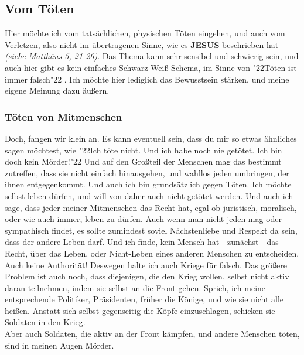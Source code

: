 \documentclass[10pt,a5paper]{article}
\newcommand{\Jesus}[0]{\textbf{JESUS}}
\newcommand{\q}[1]{\char"22{#1}\char"22 }
\begin{document}
	\subsection{Vom T\"oten}
		Hier m\"ochte ich vom tats\"achlichen,
		physischen T\"oten eingehen,
		und auch vom Verletzen,
		also nicht im \"ubertragenen Sinne,
		wie es {\Jesus} beschrieben hat
		\textit{(siehe \href{https://www.die-bibel.de/bibeln/online-bibeln/lesen/LU17/MAT.5/Matthäus-5}{Matth\"aus 5, 21-26})}.
		Das Thema kann sehr sensibel und schwierig sein,
		und auch hier gibt es kein einfaches Schwarz-Wei{\ss}-Schema,
		im Sinne von \q{T\"oten ist immer falsch}.
		Ich m\"ochte hier lediglich das Bewusstsein st\"arken,
		und meine eigene Meinung dazu \"au{\ss}ern.
	
	\subsubsection{T\"oten von Mitmenschen}
		Doch, fangen wir klein an.
		Es kann eventuell sein,
		dass du mir so etwas \"ahnliches sagen m\"ochtest,
		wie \q{Ich t\"ote nicht.
		Und ich habe noch nie get\"otet.
		Ich bin doch kein M\"order!}
		Und auf den Gro{\ss}teil der Menschen mag das bestimmt zutreffen,
		dass sie nicht einfach hinausgehen,
		und wahllos jeden umbringen,
		der ihnen entgegenkommt.
		Und auch ich bin grunds\"atzlich gegen T\"oten.
		Ich m\"ochte selbst leben d\"urfen,
		und will von daher auch nicht get\"otet werden.
		Und auch ich sage,
		dass jeder meiner Mitmenschen das Recht hat,
		egal ob juristisch,
		moralisch,
		oder wie auch immer,
		leben zu d\"urfen.
		Auch wenn man nicht jeden mag oder sympathisch findet,
		es sollte zumindest soviel N\"achstenliebe und Respekt da sein,
		dass der andere Leben darf.
		Und ich finde,
		kein Mensch hat - zun\"achst - das Recht,
		\"uber das Leben,
		oder Nicht-Leben eines anderen Menschen zu entscheiden.
		\\
		Auch keine Authorit\"at!
		Deswegen halte ich auch Kriege f\"ur falsch.
		Das gr\"o{\ss}ere Problem ist auch noch,
		dass diejenigen,
		die den Krieg wollen,
		selbst nicht aktiv daran teilnehmen,
		indem sie selbst an die Front gehen.
		Sprich,
		ich meine entsprechende Politiker,
		Pr\"asidenten,
		fr\"uher die K\"onige,
		und wie sie nicht alle hei{\ss}en.
		Anstatt sich selbst gegenseitig die K\"opfe einzuschlagen,
		schicken sie Soldaten in den Krieg.
		\\
		Aber auch Soldaten,
		die aktiv an der Front k\"ampfen,
		und andere Menschen t\"oten,
		sind in meinen Augen M\"order.
\end{document}

